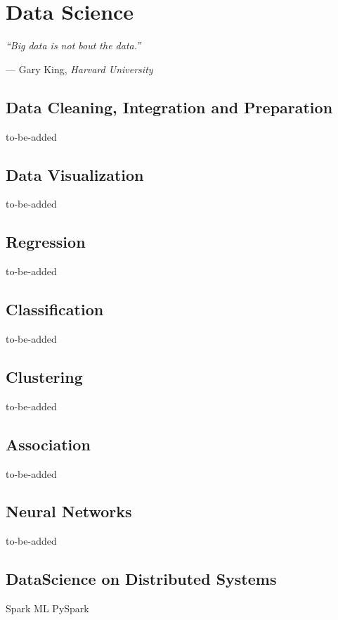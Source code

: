 \chapter{Data Science}
\label{chapter_data_science}
\setlength{\epigraphwidth}{0.5\textwidth}
\setlength\epigraphrule{0pt}
\epigraph{\itshape ``Big data is not bout the data.''}{--- Gary King, \textit{Harvard University}}

\section{Data Cleaning, Integration and Preparation}
\label{ds_}
to-be-added

\section{Data Visualization}
\label{dp_batch}
to-be-added

\section{Regression}
\label{dp_batch}
to-be-added

\section{Classification}
\label{dp_batch}
to-be-added

\section{Clustering}
\label{dp_batch}
to-be-added

\section{Association}
\label{dp_batch}
to-be-added

\section{Neural Networks}
\label{dp_batch}
to-be-added

\section{DataScience on Distributed Systems}
\label{dp_batch}
Spark ML
PySpark